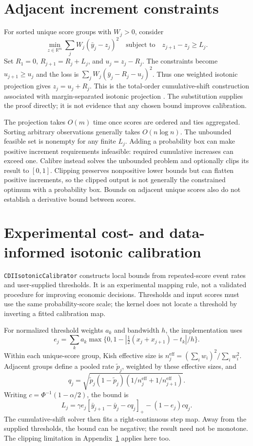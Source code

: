 \documentclass[11pt]{article}
\begin{document}
\clearpage
\appendix
\section{Adjacent increment constraints}
\label{app:shift}

For sorted unique score groups with $W_j>0$, consider
\[
\min_{z\in\mathbb R^m}\sum_jW_j(\bar y_j-z_j)^2
\quad\text{subject to}\quad z_{j+1}-z_j\geq L_j.
\]
Set $R_1=0$, $R_{j+1}=R_j+L_j$, and $u_j=z_j-R_j$. The constraints become $u_{j+1}\geq u_j$ and the loss is $\sum_jW_j(\bar y_j-R_j-u_j)^2$. Thus one weighted isotonic projection gives $z_j=u_j+R_j$. This is the total-order cumulative-shift construction associated with margin-separated isotonic projection \citep{gunasekar2016preference}. The substitution supplies the proof directly; it is not evidence that any chosen bound improves calibration.

The projection takes $O(m)$ time once scores are ordered and ties aggregated. Sorting arbitrary observations generally takes $O(n\log n)$. The unbounded feasible set is nonempty for any finite $L_j$. Adding a probability box can make positive increment requirements infeasible: required cumulative increases can exceed one. Calibre instead solves the unbounded problem and optionally clips its result to $[0,1]$. Clipping preserves nonpositive lower bounds but can flatten positive increments, so the clipped output is not generally the constrained optimum with a probability box. Bounds on adjacent unique scores also do not establish a derivative bound between scores.

\section{Experimental cost- and data-informed isotonic calibration}
\label{app:cdi}

\texttt{CDIIsotonicCalibrator} constructs local bounds from repeated-score event rates and user-supplied thresholds. It is an experimental mapping rule, not a validated procedure for improving economic decisions. Thresholds and input scores must use the same probability-score scale; the kernel does not locate a threshold by inverting a fitted calibration map.

For normalized threshold weights $a_k$ and bandwidth $h$, the implementation uses
\[
e_j=\sum_k a_k\max\{0,1-|\tfrac12(x_j+x_{j+1})-t_k|/h\}.
\]
Within each unique-score group, Kish effective size is $n_j^{\mathrm{eff}}=(\sum_iw_i)^2/\sum_iw_i^2$. Adjacent groups define a pooled rate $\tilde p_j$, weighted by these effective sizes, and
\[
q_j=\sqrt{\tilde p_j(1-\tilde p_j)
\left(1/n_j^{\mathrm{eff}}+1/n_{j+1}^{\mathrm{eff}}\right)}.
\]
Writing $c=\Phi^{-1}(1-\alpha/2)$, the bound is
\[
L_j=\gamma e_j[\bar y_{j+1}-\bar y_j-cq_j]_+
 -(1-e_j)cq_j.
\]
The cumulative-shift solver then fits a right-continuous step map. Away from the supplied thresholds, the bound can be negative; the result need not be monotone. The clipping limitation in Appendix~\ref{app:shift} applies here too.
\end{document}
